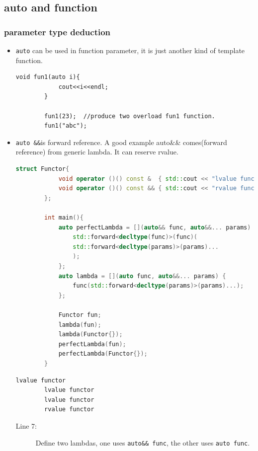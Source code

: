 \documentclass[a4paper,11pt,twoside]{book}
\begin{document}
\subsection{auto and function}

\subsubsection{parameter type deduction}
\begin{itemize}
	\item \texttt{auto} can be used in function parameter, it is just another kind of template function.
	\begin{lstlisting}[numbers=none]
		void fun1(auto i){
			cout<<i<<endl;
		}
		
		fun1(23);  //produce two overload fun1 function.
		fun1("abc");
	\end{lstlisting}
	
	\item \texttt{auto \&\&}is forward reference. A good example auto\&\& comes(forward reference) from generic lambda. It can reserve rvalue.
	\begin{lstlisting}[frame=single, language=c++]
		struct Functor{
			void operator ()() const &  { std::cout << "lvalue functor\n"; }
			void operator ()() const && { std::cout << "rvalue functor\n"; }
		};
		
		int main(){
			auto perfectLambda = [](auto&& func, auto&&... params) {
				std::forward<decltype(func)>(func)(
				std::forward<decltype(params)>(params)...
				);
			};
			auto lambda = [](auto func, auto&&... params) {
				func(std::forward<decltype(params)>(params)...);
			};
			
			Functor fun;
			lambda(fun);
			lambda(Functor{});
			perfectLambda(fun);
			perfectLambda(Functor{});
		}
	\end{lstlisting}
	
	\begin{lstlisting}[frame=single, language=c++]
		lvalue functor
		lvalue functor
		lvalue functor
		rvalue functor
	\end{lstlisting}
	
	\begin{description}
		\item[Line 7:] Define two lambdas, one uses \texttt{auto\&\& func}, the other uses \texttt{auto func}. 
	\end{description}
\end{itemize}
\end{document}
